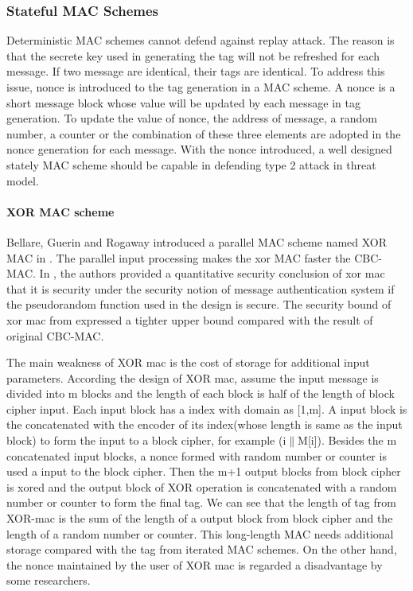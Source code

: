 \documentclass{article}
\begin{document}
\subsubsection{Stateful MAC Schemes}
Deterministic MAC schemes cannot defend against replay attack. The reason is that the secrete key used in generating the tag will not be refreshed for each message. If two message are identical, their tags are identical. To address this issue, nonce is introduced to the tag generation in a MAC scheme. A nonce is a short message block whose value will be updated by each message in tag generation. To update the value of nonce, the address of message, a random number, a counter or the combination of these three elements are adopted in the nonce generation for each message. With the nonce introduced, a well designed stately MAC scheme should be capable in defending type 2 attack in threat model.

\paragraph{XOR MAC scheme}
Bellare, Guerin and Rogaway introduced a parallel MAC scheme named XOR MAC in \cite{xor-mac}. 
The parallel input processing makes the xor MAC faster the CBC-MAC. 
In \cite{xor-mac}, the authors provided a quantitative security conclusion of xor mac that it is security under the security notion of message authentication system if the pseudorandom function used in the design is secure. The security bound of xor mac from \cite{xor-mac} expressed a tighter upper bound compared with the result of original CBC-MAC. 

The main weakness of XOR mac is the cost of storage for additional input parameters. According the design of XOR mac, assume the input message is divided into m blocks and the length of each block is half of the length of block cipher input. Each input block has a index with domain as [1,m]. A input block is the concatenated with the encoder of its index(whose length is same as the input block) to form the input to a block cipher, for example (i$\|$M[i]). Besides the m concatenated input blocks, a nonce formed with random number or counter is used a input to the block cipher. Then the m+1 output blocks from block cipher is xored and the output block of XOR operation is concatenated with a random number or counter to form the final tag. 
We can see that the length of tag from XOR-mac is the sum of the length of a output block from block cipher and the length of a random number or counter. This long-length MAC needs additional storage compared with the tag from iterated MAC schemes. 
On the other hand, the nonce maintained by the user of XOR mac is regarded a disadvantage by some researchers.
\end{document}
